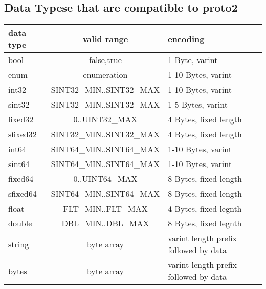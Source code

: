 \documentclass[12pt]{article}
\begin{document}
\subsection{Data Typese that are compatible to proto2}
\begin{center}
\begin{tabular}{|l|c|l|}
\hline
	data type & valid range & encoding\\
\hline
	bool	& false,true			& 1 Byte, varint\\
	enum	& enumeration			& 1-10 Bytes, varint\\
	int32	& SINT32\_MIN..SINT32\_MAX	& 1-10 Bytes, varint\\
	sint32	& SINT32\_MIN..SINT32\_MAX	& 1-5 Bytes, varint\\
	fixed32	& 0..UINT32\_MAX		& 4 Bytes, fixed length\\
	sfixed32& SINT32\_MIN..SINT32\_MAX	& 4 Bytes, fixed length\\
	int64	& SINT64\_MIN..SINT64\_MAX	& 1-10 Bytes, varint\\
	sint64	& SINT64\_MIN..SINT64\_MAX	& 1-10 Bytes, varint\\
	fixed64	& 0..UINT64\_MAX		& 8 Bytes, fixed length\\
	sfixed64& SINT64\_MIN..SINT64\_MAX	& 8 Bytes, fixed length\\
	float	& FLT\_MIN..FLT\_MAX		& 4 Bytes, fixed legnth\\
	double	& DBL\_MIN..DBL\_MAX		& 8 Bytes, fixed legnth\\
	string	& byte array			& varint length prefix followed by data\\
	bytes	& byte array			& varint length prefix followed by data\\
\hline
\end{tabular}
\end{center}
\end{document}
